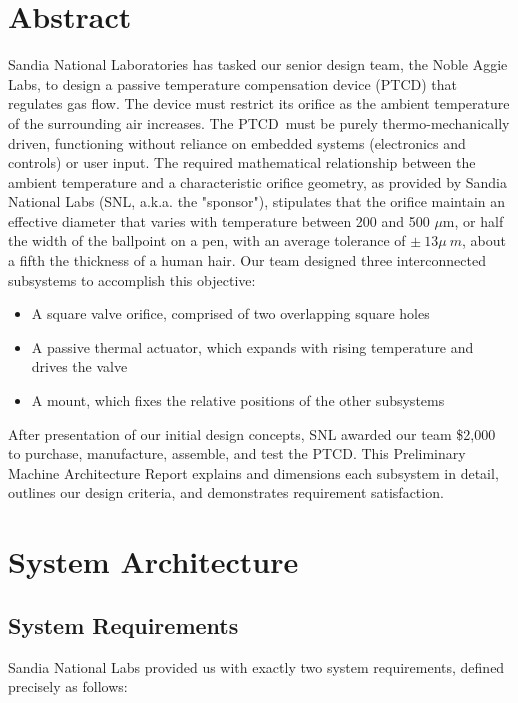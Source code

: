 \documentclass[12pt, letterpaper]{report}%
\newcounter{mycounter}           %
\newcounter{sub}[mycounter]      %
\newcommand{\teamname}{Noble Aggie Labs}
\newcommand{\device}{PTCD}
\begin{document}
\newpage
\tableofcontents
\listoffigures
\listoftables

\newpage  %

\chapter{Abstract}
\label{sec:abstract}


Sandia National Laboratories has tasked our senior design team, 
the \teamname, to design a passive temperature compensation device (\device) that regulates gas flow. 
The device must restrict its orifice as the ambient temperature of the surrounding air increases.
The \device\ must be purely thermo-mechanically driven, functioning without reliance on embedded systems (electronics and controls) or user input.
The required mathematical relationship between the ambient temperature and a characteristic orifice geometry, as provided by Sandia National Labs (SNL, a.k.a. the "sponsor"),
stipulates that the orifice maintain an effective diameter that varies with temperature between 200 and 500 $\mu$m, or half the width of the ballpoint on a pen,
with an average tolerance of $\pm\ 13 \mu\ m$, about a fifth the thickness of a human hair.
Our team designed three interconnected subsystems to accomplish this objective:

\begin{itemize}
    \item A square valve orifice, comprised of two overlapping square holes
    \item A passive thermal actuator, which expands with rising temperature and drives the valve
    \item A mount, which fixes the relative positions of the other subsystems
\end{itemize}

After presentation of our initial design concepts, SNL awarded our team \$2,000 to purchase, manufacture, assemble, and test the \device.
This Preliminary Machine Architecture Report explains and dimensions each subsystem in detail, outlines our design criteria, and demonstrates requirement satisfaction.

\chapter{System Architecture}
\label{sec:system_architecture}

    \section{System Requirements}
    \label{sec:initial_system_requirements}
        Sandia National Labs provided us with exactly two system requirements, 
        defined precisely as follows:
\end{document}
